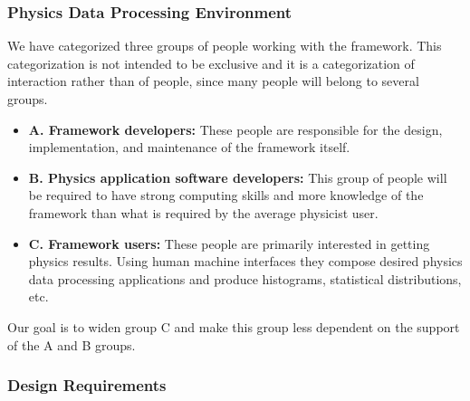 \subsubsection{Physics Data Processing Environment}

We have categorized three groups of people working with the framework. This 
categorization is not intended to be exclusive and it is a categorization of 
interaction rather than of people, since many people will belong to several 
groups.

\begin{itemize}

\item {\bf A. Framework developers:} These people are responsible for the 
design, implementation, and maintenance of the framework itself. 

\item {\bf B. Physics application software developers:} This group of people 
will be required to have strong computing skills and more knowledge of the 
framework than what is required by the average physicist user.

\item {\bf C. Framework users:} These people are primarily interested in 
getting physics results.  Using human machine interfaces they compose desired 
physics data processing applications and produce histograms, statistical 
distributions, etc.
\end{itemize}

Our goal is to widen group C and make this group less dependent on the 
support of the A and B groups. 

\subsubsection{Design Requirements}

